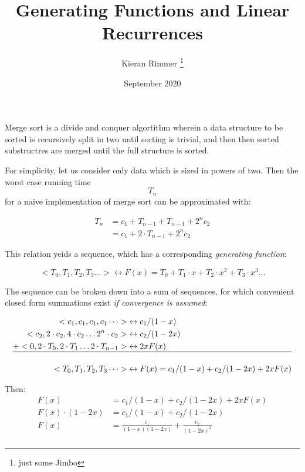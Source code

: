 \documentclass[12pt, letterpaper, twoside]{article}
\title{Generating Functions and Linear Recurrences}
\author{Kieran Rimmer \thanks{just some Jimbo}}
\date{September 2020}
\begin{document}
\maketitle

Merge sort is a divide and conquer algortithm wherein a data structure to be sorted is 
recursively split in two until sorting is trivial, and then then sorted substructres are
merged until the full structure is sorted.

For simplicity, let us consider only data which is sized in powers of two.
Then the worst case running time \[ T_n \] for a naive implementation of merge 
sort can be approximated with:

\begin{equation} 
\begin{split}
T_n & = c_1 + T_{n-1} + T_{n-1} + 2^n c_2 \\
    & = c_1 + 2 \cdot T_{n-1} + 2^n c_2 \label{eq1}
\end{split}
\end{equation}


This relation yeids a sequence, which has a corresponding \textit{generating function}:

\begin{equation} \label{eq2}
<T_0, T_1, T_2, T_3 \dots > \leftrightarrow F(x) = T_0 + T_1 \cdot x + T_2 \cdot x^2 + T_3 \cdot x^3 \dots
\end{equation}


The sequence can be broken down into a sum of sequences, for which convenient
closed form summations exist \textit{if convergence is assumed}:



\begin{equation} \label{eq3}
    \begin{split}
    <c_1, c_1, c_1, c_1 \dots > & \leftrightarrow c_1 / (1-x) \\
    <c_2, 2 \cdot c_2, 4 \cdot c_2 \dots 2^n \cdot c_2 > & \leftrightarrow c_2 / (1-2x) \\
    + <0, 2 \cdot T_0, 2 \cdot T_1 \dots 2 \cdot T_{n-1} > & \leftrightarrow 2xF(x) \\
    \hline \\
    <T_0, T_1, T_2, T_3 \dots > & \leftrightarrow F(x) = c_1 / (1-x) + c_2 / (1-2x) + 2xF(x) \\
\end{split}
\end{equation}

Then:
\begin{equation} \label{eq4}
    \begin{split}
    F(x) & = c_1 / (1-x) + c_2 / (1-2x) + 2xF(x) \\
    F(x) \cdot (1-2x) & = c_1 / (1-x) + c_2 / (1-2x) \\
    F(x) & = \frac{c_1}{(1-x)(1-2x)} + \frac{c_2}{(1-2x)^2} \\
\end{split}
\end{equation}
\end{document}

